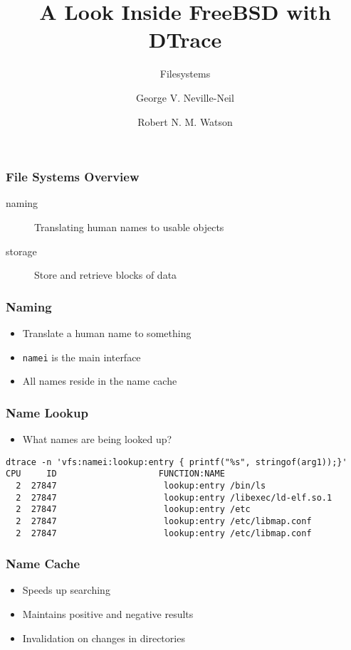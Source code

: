 \documentclass[pdftex]{beamer}
\begin{document}

\title{A Look Inside FreeBSD with DTrace}
\subtitle{Filesystems}
\author[shortname]{George V. Neville-Neil \and Robert N. M. Watson}

\begin{frame}
  \frametitle{File Systems Overview}
  \begin{description}
  \item[naming] Translating human names to usable objects
  \item[storage] Store and retrieve blocks of data
  \end{description}
\end{frame}

\begin{frame}[fragile]
  \frametitle{Naming}
  \begin{itemize}
  \item Translate a human name to something
  \item \verb+namei+ is the main interface
  \item All names reside in the name cache
  \end{itemize}
\end{frame}

\begin{frame}[fragile]
  \frametitle{Name Lookup}
  \begin{itemize}
  \item What names are being looked up?
  \end{itemize}
\begin{verbatim}
dtrace -n 'vfs:namei:lookup:entry { printf("%s", stringof(arg1));}'
CPU     ID                    FUNCTION:NAME
  2  27847                     lookup:entry /bin/ls
  2  27847                     lookup:entry /libexec/ld-elf.so.1
  2  27847                     lookup:entry /etc
  2  27847                     lookup:entry /etc/libmap.conf
  2  27847                     lookup:entry /etc/libmap.conf
\end{verbatim}
\end{frame}

\begin{frame}
  \frametitle{Name Cache}
  \begin{itemize}
  \item Speeds up searching
  \item Maintains positive and negative results
  \item Invalidation on changes in directories
  \end{itemize}
\end{frame}
\end{document}

